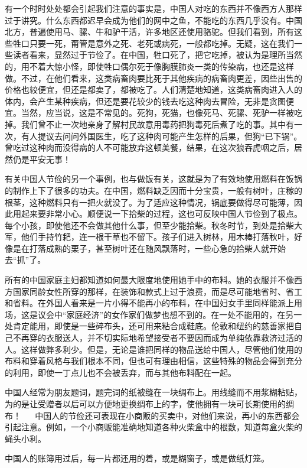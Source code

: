 \documentclass[12pt,oneside]{book}
\begin{document}
\begin{common-format}
有一个时时处处都会引起我们注意的事实是，中国人对吃的东西并不像西方人那样过于讲究。什么东西都迟早会成为他们的网中之鱼，不能吃的东西几乎没有。中国北方，普遍使用马、骡、牛和驴干活，许多地区还使用骆驼。但我们看到，所有这些牲口只要一死，甭管是意外之死、老死或病死，一般都吃掉。无疑，这在我们一些读者看来，显然过于节俭了。在中国，牲口死了，把它吃掉，被认为是理所当然的，用不着大惊小怪，即使牲口偶尔死于像胸膜肺炎一类的传染病，也还是这样做。不过，在他们看来，这类病畜肉要比死于其他疾病的病畜肉更差，因些出售的价格也较便宜，但还是都卖了，都被吃了。人们清楚地知道，这类病畜肉进入人的体内，会产生某种疾病，但还是要花较少的钱去吃这种肉去冒险，无非是贪图便宜。当然，应当说，这是不常见的。死狗，死猫，也像死马、死骡、死驴一样被吃掉。我们曾不止一次地亲身了解村民故意用毒药把狗毒死后煮了吃的事。其中有一次，有人提议去问问外国医生，吃了这种肉可能产生怎样的后果，但狗“已下锅”。曾吃过这种肉而没得病的人不可能放弃这顿美餐，结果，在这次狼吞虎咽之后，居然仍是平安无事！ 

有关中国人节俭的另一个事例，也与做饭有关，这就是为了有效地使用燃料在饭锅的制作上下了很多的功夫。在中国，燃料缺乏因而十分宝贵，一般有树叶，庄稼的根茎，这种燃料只有一把火就没了。为了适应这种情况，锅底要做得尽可能薄，因此用起来要非常小心。顺便说一下拾柴的过程，这也可反映中国人节俭到了极点。每个小孩，即使他还不会做其他什么事，但至少能拾柴。秋冬时节，到处是拾柴大军，他们手持竹耙，连一根干草也不留下。孩子们进入树林，用木棒打落秋叶，好像是在打落成熟的栗子，甚至树叶还在随风飘落时，一些心急的拾柴人就开始去“抓”了。 

所有的中国家庭主妇都知道如何最大限度地使用她手中的布料。她的衣服并不像西方国家同龄女性所穿的那样，在装饰和款式上过于浪费，而是尽可能地省时、省工和省料。在外国人看来是一片小得不能再小的布料，在中国妇女手里同样能派上用场，这是议会中“家庭经济”的女作家们做梦也想不到的。在一处不能用的，在另一处肯定能用，即使是一些碎布头，还可用来粘合成鞋底。伦敦和纽约的慈善家把自己不再穿的衣服送人，并不切实际地希望接受者不要因而成为单纯依靠救济过活的人。这样做弊多利少。但是，无论是谁把同样的物品送给中国人，尽管他们使用的布料和穿着风格与我们根本不同，但也可有理由相信，这些特殊的物品会得到充分的利用，即使一丁点儿也不会被丢弃，而与其他布料配在一起。 

中国人经常为朋友题词，题完词的纸被缝在一块绸布上。用线缝而不用浆糊粘贴，为的是让受赠者以后可以方便地更换绸布上的字，使他拥有一块可长期使用的绸布！ 
　
中国人的节俭还可表现在小商贩的买卖中，对他们来说，再小的东西都会引起注意。例如，一个小商贩能准确地知道各种火柴盒中的根数，知道每盒火柴的蝇头小利。 

中国人的账簿用过后，每一片都还用的着，或是糊窗子，或是做纸灯笼。 


\end{common-format}
\end{document}
